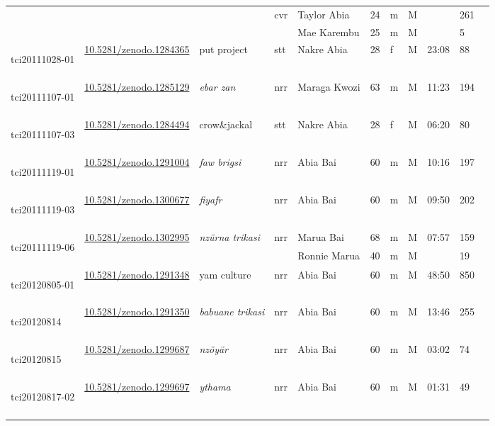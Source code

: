 \begin{landscape}
{\begin{longtable}{p{}llllllllll}
	&&&\multirow{2}{*}{cvr} & Taylor Abia	& 24 & m & M && 261\\
	&&&& Mae Karembu	& 25 & m & M && 5\\\hline
	\hypertarget{tci20111028-01}{tci20111028-01} &\href{https://zenodo.org/record/1284365}{10.5281/zenodo.1284365}& put project& stt & Nakre Abia & 28 & f & M & 23:08 & 88\\\hline
	\hypertarget{tci20111107-01}{tci20111107-01} &\href{https://zenodo.org/record/1285129}{10.5281/zenodo.1285129}& \emph{ebar zan} & nrr & Maraga Kwozi & 63 & m & M & 11:23 & 194\\\hline
	\hypertarget{tci20111107-03}{tci20111107-03} &\href{https://zenodo.org/record/1284494}{10.5281/zenodo.1284494}& crow\&jackal & stt & Nakre Abia & 28 & f & M & 06:20 & 80\\\hline
	\hypertarget{tci20111119-01}{tci20111119-01} &\href{https://zenodo.org/record/1291004}{10.5281/zenodo.1291004}& \emph{faw brigsi} & nrr & Abia Bai & 60 & m & M & 10:16 & 197\\\hline
	\hypertarget{tci20111119-03}{tci20111119-03} &\href{https://zenodo.org/record/1300677}{10.5281/zenodo.1300677}& \emph{fiyafr} & nrr & Abia Bai & 60 & m & M & 09:50 & 202\\\hline
	\multirow{2}{*}{\hypertarget{tci20111119-06}{tci20111119-06}} &\multirow{2}{*}{\href{https://zenodo.org/record/1302995}{10.5281/zenodo.1302995}}& \multirow{2}{*}{\emph{nzürna trikasi}} & \multirow{2}{*}{nrr} & Marua Bai & 68 & m & M & \multirow{2}{*}{07:57} & 159\\
	&&&& Ronnie Marua & 40 & m & M & &19\\\hline
	\hypertarget{tci20120805-01}{tci20120805-01} &\href{https://zenodo.org/record/1291348}{10.5281/zenodo.1291348}& yam culture & nrr & Abia Bai & 60 & m & M & 48:50 & 850\\\hline
	\hypertarget{tci20120814}{tci20120814} &\href{https://zenodo.org/record/1291350}{10.5281/zenodo.1291350}& \emph{babuane trikasi} & nrr & Abia Bai & 60 & m & M & 13:46 & 255\\\hline
	\hypertarget{tci20120815}{tci20120815} &\href{https://zenodo.org/record/1299687}{10.5281/zenodo.1299687}& \emph{nzöyär} & nrr & Abia Bai & 60 & m & M & 03:02 & 74\\\hline
	\hypertarget{tci20120817-02}{tci20120817-02} &\href{https://zenodo.org/record/1299697}{10.5281/zenodo.1299697}& \emph{ythama} & nrr & Abia Bai & 60 & m & M & 01:31 & 49\\\hline
	& & & & & & & & & \\

\end{longtable}}
\end{landscape}
